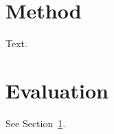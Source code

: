 \documentclass{article}
\begin{document}
\section{Method}\label{sec:method}
Text.
\section{Evaluation}\label{sec:evaluation}
See Section~\ref{sec:method}.
\end{document}
